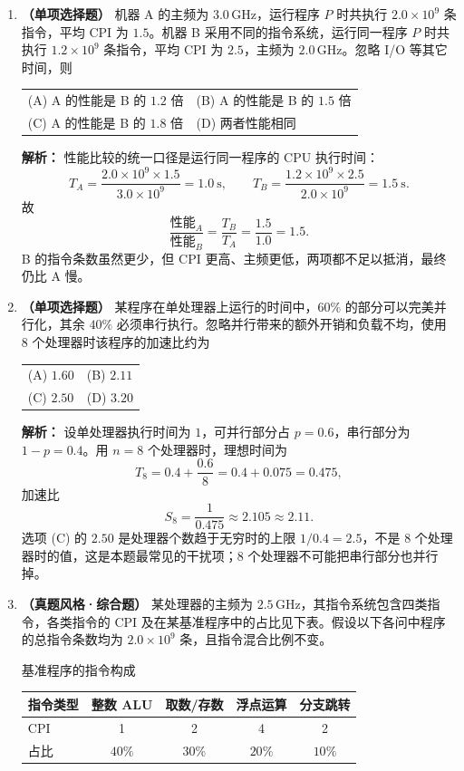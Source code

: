 \begin{enumerate}

\item \textbf{（单项选择题）} 机器 A 的主频为 $3.0\,\mathrm{GHz}$，运行程序 $P$ 时共执行 $2.0\times10^{9}$ 条指令，平均 CPI 为 $1.5$。机器 B 采用不同的指令系统，运行同一程序 $P$ 时共执行 $1.2\times10^{9}$ 条指令，平均 CPI 为 $2.5$，主频为 $2.0\,\mathrm{GHz}$。忽略 I/O 等其它时间，则
\begin{center}
\begin{tabular}{ll}
(A) A 的性能是 B 的 $1.2$ 倍 & (B) A 的性能是 B 的 $1.5$ 倍 \\[4pt]
(C) A 的性能是 B 的 $1.8$ 倍 & (D) 两者性能相同
\end{tabular}
\end{center}

\ifshowsolutions\par\noindent\textbf{解析：} 性能比较的统一口径是运行同一程序的 CPU 执行时间：
\[
T_A=\frac{2.0\times10^{9}\times1.5}{3.0\times10^{9}}=1.0\ \mathrm{s},
\qquad
T_B=\frac{1.2\times10^{9}\times2.5}{2.0\times10^{9}}=1.5\ \mathrm{s}.
\]
故
\[
\frac{\text{性能}_A}{\text{性能}_B}=\frac{T_B}{T_A}=\frac{1.5}{1.0}=1.5.
\]
B 的指令条数虽然更少，但 CPI 更高、主频更低，两项都不足以抵消，最终仍比 A 慢。\else \answerarea \fi

\item \textbf{（单项选择题）} 某程序在单处理器上运行的时间中，$60\%$ 的部分可以完美并行化，其余 $40\%$ 必须串行执行。忽略并行带来的额外开销和负载不均，使用 $8$ 个处理器时该程序的加速比约为
\begin{center}
\begin{tabular}{ll}
(A) $1.60$ & (B) $2.11$ \\[4pt]
(C) $2.50$ & (D) $3.20$
\end{tabular}
\end{center}

\ifshowsolutions\par\noindent\textbf{解析：} 设单处理器执行时间为 $1$，可并行部分占 $p=0.6$，串行部分为 $1-p=0.4$。用 $n=8$ 个处理器时，理想时间为
\[
T_8=0.4+\frac{0.6}{8}=0.4+0.075=0.475,
\]
加速比
\[
S_8=\frac{1}{0.475}\approx2.105\approx2.11.
\]
选项 (C) 的 $2.50$ 是处理器个数趋于无穷时的上限 $1/0.4=2.5$，不是 $8$ 个处理器时的值，这是本题最常见的干扰项；$8$ 个处理器不可能把串行部分也并行掉。\else \answerarea \fi

\item \textbf{（真题风格·综合题）} 某处理器的主频为 $2.5\,\mathrm{GHz}$，其指令系统包含四类指令，各类指令的 CPI 及在某基准程序中的占比见下表。假设以下各问中程序的总指令条数均为 $2.0\times10^{9}$ 条，且指令混合比例不变。
\begin{tablebox}{基准程序的指令构成}
\centering
\begin{tabular}{lcccc}
\toprule
指令类型 & 整数 ALU & 取数/存数 & 浮点运算 & 分支跳转 \\
\midrule
CPI & 1 & 2 & 4 & 2 \\
占比 & $40\%$ & $30\%$ & $20\%$ & $10\%$ \\
\bottomrule
\end{tabular}
\end{tablebox}


\end{enumerate}
